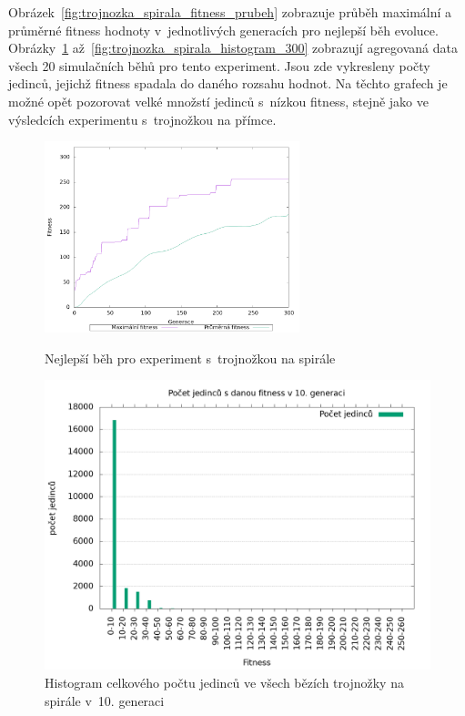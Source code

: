Obrázek~\ref{fig:trojnozka_spirala_fitness_prubeh} zobrazuje průběh maximální a průměrné fitness hodnoty v~jednotlivých generacích pro nejlepší běh evoluce.
Obrázky~\ref{fig:trojnozka_spirala_histogram_10} až~\ref{fig:trojnozka_spirala_histogram_300} zobrazují agregovaná data všech 20 simulačních běhů pro tento experiment.
Jsou zde vykresleny počty jedinců, jejichž fitness spadala do daného rozsahu hodnot.
Na těchto grafech je možné opět pozorovat velké množstí jedinců s~nízkou fitness, stejně jako ve výsledcích experimentu s~trojnožkou na přímce.

\begin{figure}[h]
    \begin{minipage}[c]{0.48\linewidth}
    {\includegraphics[width=20em]{obrazky/trojnozka_spirala_fitness_prubeh.png}}
        \caption{
        Nejlepší běh pro experiment s~trojnožkou na spirále
        }
        \label{fig:trojnozka_spirala_fitness_prubeh}

    \end{minipage}
    \hfill
    \begin{minipage}[c]{0.48\linewidth}
        \includegraphics[width=\linewidth]{obrazky/trojnozka_spirala_fitnessHistogram10.png}
        \caption{Histogram celkového počtu jedinců ve všech bězích trojnožky na spirále v~10. generaci}
        \label{fig:trojnozka_spirala_histogram_10}
    \end{minipage}
\end{figure}

